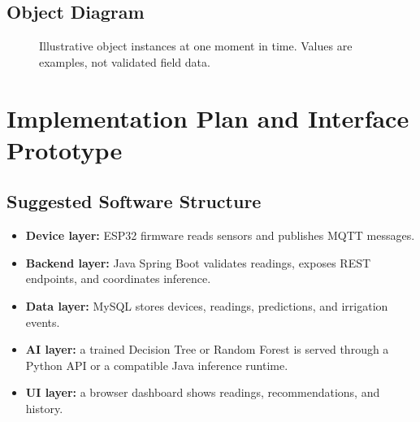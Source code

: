 \documentclass[12pt,a4paper]{report}
\begin{document}
\section{Object Diagram}
\begin{figure}[H]
\centering
{}
\caption{Illustrative object instances at one moment in time. Values are examples, not validated field data.}
\end{figure}

\chapter{Implementation Plan and Interface Prototype}
\section{Suggested Software Structure}
\begin{itemize}[leftmargin=*]
\item \textbf{Device layer:} ESP32 firmware reads sensors and publishes MQTT messages.
\item \textbf{Backend layer:} Java Spring Boot validates readings, exposes REST endpoints, and coordinates inference.
\item \textbf{Data layer:} MySQL stores devices, readings, predictions, and irrigation events.
\item \textbf{AI layer:} a trained Decision Tree or Random Forest is served through a Python API or a compatible Java inference runtime.
\item \textbf{UI layer:} a browser dashboard shows readings, recommendations, and history.
\end{itemize}
\end{document}
